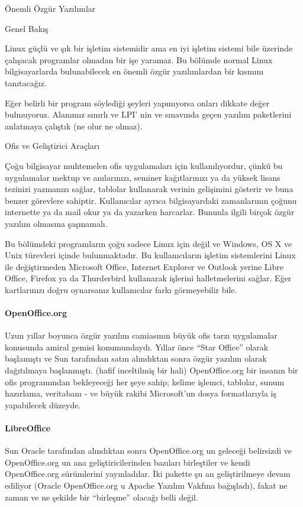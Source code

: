 \begin{section}{Önemli Özgür Yazılımlar}
\begin{subsection}{Genel Bakış}

Linux güçlü ve şık bir işletim sistemidir ama en iyi işletim sistemi bile üzerinde çalışacak programlar olmadan bir işe yaramaz. Bu bölümde normal Linux bilgisayarlarda bulunabilecek en önemli özgür yazılımlardan bir kısmını tanıtacağız.

Eğer belirli bir program söylediği şeyleri yapmıyorsa onları dikkate değer bulmuyoruz. Alanımız sınırlı ve LPI' nin ve sınavında geçen yazılım paketlerini anlatmaya çalıştık (ne olur ne olmaz).
\end{subsection}
\begin{subsection}{Ofis ve Geliştirici Araçları}

Çoğu bilgisayar muhtemelen ofis uygulamaları için kullanılıyordur, çünkü bu uygulamalar mektup ve anılarınızı, seminer kağıtlarınızı ya da yüksek lisans tezinizi yazmanızı sağlar, tablolar kullanarak verinin gelişimini gösterir ve buna benzer görevlere sahiptir. Kullanıcılar ayrıca bilgisayardaki zamanlarının çoğunu internette ya da mail okur ya da yazarken harcarlar. Bununla ilgili birçok özgür yazılım olmasına şaşmamalı.

Bu bölümdeki programların çoğu sadece Linux için değil ve Windows, OS X ve Unix türevleri içinde bulunmaktadır. Bu kullanıcıların işletim sistemlerini Linux ile değiştirmeden Microsoft Office, Internet Explorer ve Outlook yerine Libre Office, Firefox ya da Thurderbird kullanarak işlerini halletmelerini sağlar. Eğer kartlarınızı doğru oynarsanız kullanıcılar farkı görmeyebilir bile.
\paragraph{OpenOffice.org}{Uzun yıllar boyunca özgür yazılım camiasının büyük ofis tarzı uygulamalar konusunda amiral gemisi konumundaydı. Yıllar önce “Star Office” olarak başlamıştı ve Sun tarafından satın alındıktan sonra özgür yazılım olarak dağıtılmaya başlanmıştı. (hafif inceltilmiş bir hali) OpenOffice.org bir insanın bir ofis programından bekleyeceği her şeye sahip; kelime işlemci, tablolar, sunum hazırlama, veritabanı - ve büyük rakibi Microsoft'un dosya formatlarıyla iş yapabilecek düzeyde.}
\paragraph{LibreOffice}{Sun Oracle tarafından alındıktan sonra OpenOffice.org un geleceği belirsizdi ve OpenOffice.org un ana geliştiricilerinden bazıları birleştiler ve kendi OpenOffice.org sürümlerini yayınladılar. İki pakette şu an geliştirilmeye devam ediliyor (Oracle OpenOffice.org u Apache Yazılım Vakfına bağışladı), fakat ne zaman ve ne şekilde bir “birleşme” olacağı belli değil.}


\end{subsection}
\end{section}
